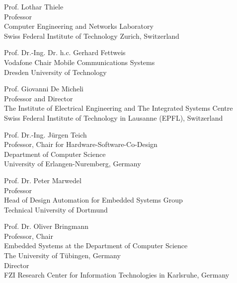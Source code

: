 Prof. Lothar Thiele \\
Professor  \\
Computer Engineering and Networks Laboratory  \\
Swiss Federal Institute of Technology Zurich, Switzerland \\
\vspace{5mm}

Prof. Dr.-Ing. Dr. h.c. Gerhard Fettweis  \\
Vodafone Chair Mobile Communications Systems \\
Dresden University of Technology \\
\vspace{5mm}

Prof. Giovanni De Micheli  \\
Professor and Director  \\
The Institute of Electrical Engineering and The Integrated Systems Centre \\
Swiss Federal Institute of Technology in Lausanne (EPFL), Switzerland \\
\vspace{5mm}

Prof. Dr.-Ing. J\"{u}rgen Teich \\
Professor, Chair for Hardware-Software-Co-Design \\
Department of Computer Science \\
University of Erlangen-Nuremberg, Germany \\
\vspace{5mm}

Prof. Dr. Peter Marwedel \\
Professor   \\
Head of Design Automation for Embedded Systems Group  \\
Technical University of Dortmund  \\
\vspace{5mm}


Prof. Dr. Oliver Bringmann \\
Professor, Chair  \\
Embedded Systems at the Department of Computer Science  \\
The University of T\"{u}bingen, Germany \\
Director  \\
FZI Research Center for Information Technologies in Karlsruhe, Germany \\
\vspace{5mm}
